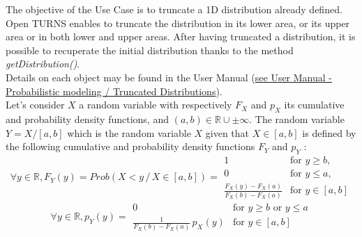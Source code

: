\renewcommand{\filename}{docUC_InputNoData_TruncatedDist.tex}
\renewcommand{\filetitle}{UC : Creation of a truncated distribution}

\HeaderIIILevel
\label{truncatedistribution}





The objective of the Use Case is to truncate a 1D distribution already defined. Open TURNS enables to truncate the distribution in its lower area, or its upper area or in both lower and upper areas. After having  truncated a distribution, it is possible to recuperate the initial distribution thanks to the method {\itshape getDistribution()}.\\

Details on each object may be found in the User Manual  (\href{OpenTURNS_UserManual_TUI.pdf}{see User Manual - Probabilistic modeling / Truncated Distributions}).\\

Let's consider $X$ a random variable with respectively $F_X$ and $p_X$ its cumulative and probability density functions, and $(a,b)\in \mathbb{R} \cup {\pm \infty}$. The random variable $Y=X/[a,b]$ which is the random variable $X$ given that $X\in[a,b]$ is defined by the following cumulative and probability density functions $F_Y$ and $p_Y$ :
$$
\forall y \in \mathbb{R}, F_Y(y) = Prob(X<y\, / \, X\in[a,b]) =
\begin{array}{|ll}
  1 & \mbox{for } y \geq b, \\
  0 & \mbox{for } y \leq a, \\
  \displaystyle \frac{F_X(y) - F_X(a)}{F_X(b) - F_X(a)} & \mbox{for } y\in[a,b]
\end{array}
$$
$$
\forall y \in \mathbb{R}, p_Y(y) =
\begin{array}{|ll}
  0 &  \mbox{for } y \geq b  \mbox{ or }  y \leq a\\
  \displaystyle \frac{1}{F_X(b) - F_X(a)}\, p_X(y) & \mbox{for } y\in[a,b]
\end{array}
$$





